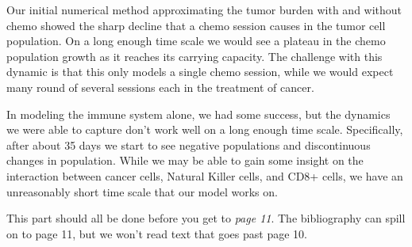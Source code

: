\documentclass[11pt]{amsart}
\begin{document}
Our initial numerical method approximating the tumor burden with and without chemo showed the sharp decline that a chemo session causes in the tumor cell population. 
On a long enough time scale we would see a plateau in the chemo population growth as it reaches its carrying capacity. 
The challenge with this dynamic is that this only models a single chemo session, 
while we would expect many round of several sessions each in the treatment of cancer.

In modeling the immune system alone, we had some success, 
but the dynamics we were able to capture don't work well on a long enough time scale. 
Specifically, after about 35 days we start to see negative populations and discontinuous changes 
in population. While we may be able to gain some insight on the interaction between cancer cells, 
Natural Killer cells, and CD8+ cells, we have an unreasonably short time scale that our model works on. 

This part should all be done before you get to \emph{page 11}.  The bibliography can spill on to page 11, but we won't read text that goes past page 10.

\appendix
\end{document}
